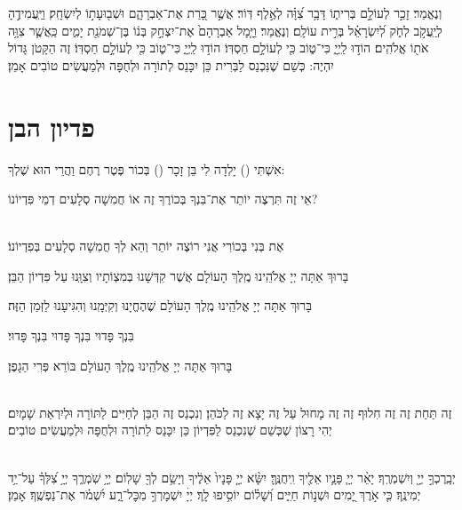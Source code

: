 \documentclass[twoside, openany, parskip=half, 11pt]{book}
\begin{document}

וְנֶאֱמַר׃ זָכַ֣ר לְעוֹלָ֣ם בְּרִית֑וֹ דָּבָ֥ר צִ֝וָּ֗ה לְאֶ֣לֶף דּֽוֹר׃ אֲשֶׁ֣ר כָּ֭רַת אֶת־אַבְרָהָ֑ם
וּשְׁב֖וּעָת֣וֹ לְיִשְׂחָֽק׃ וַיַּֽעֲמִידֶ֣הָ לְיַֽעֲקֹ֣ב לְחֹ֑ק לְ֝יִשְׂרָאֵ֗ל בְּרִ֣ית עוֹלָֽם׃
וְנֶאֱמַר׃ וַיָּ֤מָל אַבְרָהָם֙ אֶת־יִצְחָ֣ק בְּנ֔וֹ בֶּן־שְׁמֹנַ֖ת יָמִ֑ים כַּֽאֲשֶׁ֛ר צִוָּ֥ה אֹת֖וֹ אֱלֹהִֽים׃ הוֹד֣וּ לַֽיְיָ֑ כִּי־ט֑וֹב כִּ֖י לְעוֹלָ֣ם חַסְדּֽוֹ׃
הוֹד֣וּ לַֽיְיָ֑ כִּי־ט֑וֹב כִּ֖י לְעוֹלָ֣ם חַסְדּֽוֹ׃
 זֶה הַקָּטֹן גָּדוֹל יִהְיֶה:
כְּשֵׁם שֶׁנִּכְנַס לַבְּרִית כֵּן יִכָּנֵס לְתוֹרָה וּלְחֻפָּה וּלְמַעֲשִׂים טוֹבִים אָמֵן׃

\vfill
\sepline

\chapter[פדיון הבן]{ פדיון הבן }


אִשְׁתִּי () יָלְדָה לִי בֵּן זָכָר () בְּכוֹר פֶּטֶר רֶחֶם וַהֲרֵי הוּא שֶׁלְךָ:

אֵי זֶה תִּרְצֶה יוֹתֵר אֶת־בִּנְךָ בְּכוֹרֶךָ זֶה אוֹ חֲמִשָׁה סְלָעִים דְמֵי פִּדְיוֹנוֹ?

\\
אֶת בְּנִי בְּכוֹרִי אֲנִי רוֹצֶה יוֹתֵר וְהֵא לְךָ חֲמִשָׁה סְלָעִים בְּפִדְיוֹנוֹ׃

בָּרוּךְ אַתָּה יְיָ אֱלֹהֵֽינוּ מֶֽלֶךְ הָעוֹלָם אֲשֶׁר קִדְּשָׁנוּ בְּמִצְוֹתָיו וְצִוָּֽנוּ עַל פִּדְיוֹן הַבֵּן׃

בָּרוּךְ אַתָּה יְיָ אֱלֹהֵֽינוּ מֶֽלֶךְ הָעוֹלָם שֶׁהֶחֱיָנוּ וְקִיְּמָֽנוּ וְהִגִּיעָנוּ לַזְּמַן הַזֶּה׃


בִּנְךָ פָּדוּי בִּנְךָ פָּדוּי בִּנְךָ פָּדוּי׃

בָּרוּךְ אַתָּה יְיָ אֱלֹהֵֽינוּ מֶֽלֶךְ הָעוֹלָם בּוֹרֵא פְּרִי הַגָפֶן׃

 \\
זֶה תַּחַת זֶה זֶה חִלוּף זֶה זֶה מָחוּל עַל זֶה יָצָא זֶה לַכֹּהֵן׃
וְנִכְנַס זֶה הַבֵּן לְחַיִּים לַתּוֹרָה וּלְיִרְאַת שָׁמָיִם׃
יְהִי רָצוֹן שֶׁכְּשֵׁם שֶׁנִכְנַס לַפִּדְיוֹן כֵּן יִכָּנֵס לַתוֹרָה וּלְחֻפָּה וּלְמַעֲשִׂים טוֹבִים׃

\\
יְבָֽרֶכְךָ֣ יְיָ֖ וְיִשְׁמְרֶֽךָ׃ יָאֵ֨ר יְיָ֧ פָּנָ֛יו אֵלֶ֖יךָ וִֽיחֻנֶּֽךָּ׃ יִשָּׂ֨א יְיָ֤ פָּנָיו֙ אֵלֶ֔יךָ וְיָשֵׂ֥ם לְךָ֖ שָׁלֽוֹם׃
יְיָ֥ שֹֽׁמְרֶ֑ךָ יְיָ֥ צִ֝לְּךָ֗ עַל־יַ֥ד יְמִינֶֽךָ׃
כִּ֤י אֹ֣רֶךְ יָ֭מִים וּשְׁנ֣וֹת חַיִּ֑ים וְ֝שָׁל֗וֹם יוֹסִ֥יפוּ לָֽךְ׃
יְיָׄ יִשְׁמָרְךָ֥ מִכׇּל־רָ֑ע יִ֝שְׁמֹ֗ר אֶת־נַפְשֶֽׁךָ׃ אָמֵן׃
\end{document}
